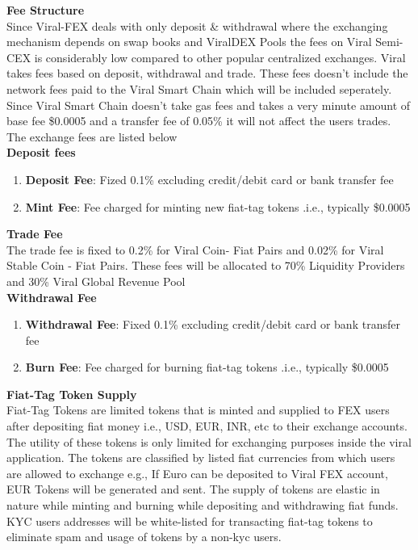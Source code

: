 \documentclass[10pt]{article}
\begin{document}
\textbf{Fee Structure}\\

Since Viral-FEX deals with only deposit \& withdrawal where the exchanging mechanism depends on swap books and ViralDEX Pools the fees on  Viral Semi-CEX is considerably low compared to other popular centralized exchanges. Viral takes fees based on deposit, withdrawal and trade. These fees doesn't include the network fees paid to the Viral Smart Chain which will be included seperately. Since Viral Smart Chain doesn't take gas fees and takes a very minute amount of base fee \$0.0005 and a transfer fee of 0.05\% it will not affect the users trades. The exchange fees are listed below\\

\textbf{Deposit fees}
\begin{enumerate}[leftmargin=+0.2in]
\item \textbf{Deposit Fee}: Fized 0.1\% excluding credit/debit card or bank transfer fee
\item \textbf{Mint Fee}: Fee charged for minting new fiat-tag tokens .i.e., typically \$0.0005
\end{enumerate}

\textbf{Trade Fee}\\

The trade fee is fixed to 0.2\% for Viral Coin- Fiat Pairs and 0.02\% for Viral Stable Coin - Fiat Pairs. These fees will be allocated to 70\% Liquidity Providers and 30\% Viral Global Revenue Pool\\

\textbf{Withdrawal Fee}
\begin{enumerate}[leftmargin=+0.2in]
\item \textbf{Withdrawal Fee}: Fixed 0.1\% excluding credit/debit card or bank transfer fee
\item \textbf{Burn Fee}: Fee charged for burning fiat-tag tokens .i.e., typically \$0.0005
\end{enumerate}


\textbf{Fiat-Tag Token Supply}\\

Fiat-Tag Tokens are limited tokens that is minted and supplied to FEX users after depositing fiat money i.e., USD, EUR, INR, etc to their exchange accounts. The utility of these tokens is only limited for exchanging purposes inside the viral application. The tokens are classified by listed fiat currencies from which users are allowed to exchange e.g., If Euro can be deposited to Viral FEX account, EUR Tokens will be generated and sent. The supply of tokens are elastic in nature while minting and burning while depositing and withdrawing fiat funds. KYC users addresses will be white-listed for transacting fiat-tag tokens to eliminate spam and usage of tokens by a non-kyc users.\\
\end{document}
